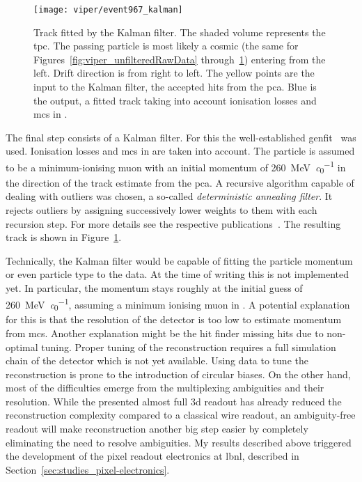\begin{figure}[tbp]
	\centering
	\texttt{[image: viper/event967\_kalman]}
	\caption[Kalman-fitted track of typical pixel demonstrator event]{%
		Track fitted by the Kalman filter.
		The shaded volume represents the \acrshort{tpc}.
		The passing particle is most likely a cosmic \Pgm (the same for Figures~\ref{fig:viper_unfilteredRawData} through~\ref{fig:viper_kalman}) entering from the left.
		Drift direction is from right to left.
		The yellow points are the input to the Kalman filter, the accepted hits from the \acrshort{pca}.
		Blue is the output, a fitted track taking into account ionisation losses and \acrshort{mcs} in \lar{}.
	}
	\label{fig:viper_kalman}
\end{figure}

The final step consists of a Kalman filter.
For this the well-established \gls{genfit}~\cite{genfit1, genfit2} was used.
Ionisation losses and \gls{mcs} in \lar{} are taken into account.
The particle is assumed to be a minimum-ionising muon with an initial momentum of \SI{260}{\mega\electronvolt\per\clight} in the direction of the track estimate from the \gls{pca}.
A recursive algorithm capable of dealing with outliers was chosen, a so-called \emph{deterministic annealing filter}.
It rejects outliers by assigning successively lower weights to them with each recursion step.
For more details see the respective publications~\cite{genfit1, genfit2}.
The resulting track is shown in Figure~\ref{fig:viper_kalman}.

Technically, the Kalman filter would be capable of fitting the particle momentum or even particle type to the data.
At the time of writing this is not implemented yet.
In particular, the momentum stays roughly at the initial guess of \SI{260}{\mega\electronvolt\per\clight}, assuming a minimum ionising muon in \lar{}.
A potential explanation for this is that the resolution of the detector is too low to estimate momentum from \gls{mcs}.
Another explanation might be the hit finder missing hits due to non-optimal tuning.
Proper tuning of the reconstruction requires a full simulation chain of the detector which is not yet available.
Using data to tune the reconstruction is prone to the introduction of circular biases.
On the other hand, most of the difficulties emerge from the multiplexing ambiguities and their resolution.
While the presented almost full \gls{3d} readout has already reduced the reconstruction complexity compared to a classical wire readout, an ambiguity-free readout will make reconstruction another big step easier by completely eliminating the need to resolve ambiguities.
My results described above triggered the development of the \larpix{} pixel readout electronics at \gls{lbnl}, described in Section~\ref{sec:studies_pixel-electronics}.


